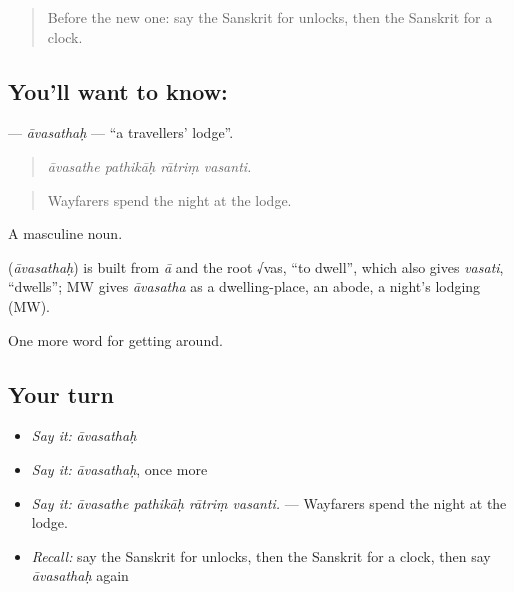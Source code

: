 \label{lesson:SA-C429-avasathah}



\begin{quote}
Before the new one: say the Sanskrit for unlocks, then the Sanskrit for a clock.
\end{quote}

\subsection*{You'll want to know: }
\textbf{} — \emph{āvasathaḥ} — \textquotedblleft{}a travellers' lodge\textquotedblright{}.

\begin{quote}
   
\end{quote}

\begin{quote}
\emph{āvasathe pathikāḥ rātriṃ vasanti.}
\end{quote}

\begin{quote}
Wayfarers spend the night at the lodge.
\end{quote}

A masculine noun.

\begin{cousinweb}
\textbf{} (\emph{āvasathaḥ}) is built from \emph{ā} and the root √vas, \textquotedblleft{}to dwell\textquotedblright{}, which also gives \emph{vasati}, \textquotedblleft{}dwells\textquotedblright{}; MW gives \emph{āvasatha} as a dwelling-place, an abode, a night's lodging (MW).
\end{cousinweb}

\begin{grammarlens}[title={What you've built}]
One more word for getting around.
\end{grammarlens}

\subsection*{Your turn}
\begin{itemize}
\raggedright
  \item \emph{Say it:} \emph{āvasathaḥ}
  \item \emph{Say it:} \emph{āvasathaḥ}, once more
  \item \emph{Say it:} \emph{āvasathe pathikāḥ rātriṃ vasanti.} — Wayfarers spend the night at the lodge.
  \item \emph{Recall:} say the Sanskrit for unlocks, then the Sanskrit for a clock, then say \emph{āvasathaḥ} again
\end{itemize}

